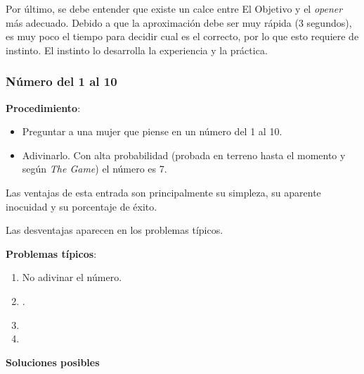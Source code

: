 \documentclass{article}
\begin{document}
Por último, se debe entender que existe un calce entre El Objetivo y el \textit{opener} más adecuado. Debido a que la aproximación debe ser muy rápida (3 segundos), es muy poco el tiempo para decidir cual es el correcto, por lo que esto requiere de instinto. El instinto lo desarrolla la experiencia y la práctica.

\subsubsection{Número del 1 al 10}
\textbf{Procedimiento}:
\begin{itemize}
\item Preguntar a una mujer que piense en un número del 1 al 10.
\item Adivinarlo. Con alta probabilidad (probada en terreno hasta el momento y según \textit{The Game}) el número es 7.
\end{itemize}
Las ventajas de esta entrada son principalmente su simpleza, su aparente inocuidad y su porcentaje de éxito.

Las desventajas aparecen en los problemas típicos.

\textbf{Problemas típicos}:
\begin{enumerate}

\item No adivinar el número.
\item {}.
\item {}
\item {}
\end{enumerate}

\textbf{Soluciones posibles}
\end{document}
